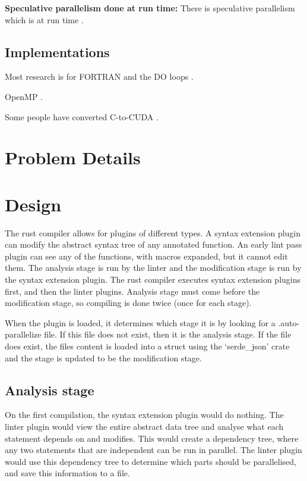 \documentclass[conference]{IEEEtran}
\begin{document}
\textbf{Speculative parallelism done at run time:}
There is speculative parallelism which is at run time \parencite{Yiapanis2015}.

\subsection{Implementations}
Most research is for FORTRAN and the DO loops \parencite{Banerjee1993}.

OpenMP \parencite{Dagum1998,Lam2011}.

Some people have converted C-to-CUDA \parencite{Baskaran2010, Verdoolaege2013}.

\section{Problem Details}


\section{Design}
The rust compiler allows for plugins of different types. A syntax extension plugin can modify the abstract syntax tree of any annotated function. An early lint pass plugin can see any of the functions, with macros expanded, but it cannot edit them.  The analysis stage is run by the linter and the modification stage is run by the syntax extension plugin. The rust compiler executes syntax extension plugins first, and then the linter plugins. Analysis stage must come before the modification stage, so compiling is done twice (once for each stage).

When the plugin is loaded, it determines which stage it is by looking for a .auto-parallelize file. If this file does not exist, then it is the analysis stage. If the file does exist, the files content is loaded into a struct using the `serde\_json' crate and the stage is updated to be the modification stage.

\subsection{Analysis stage}
On the first compilation, the syntax extension plugin would do nothing. The linter plugin would view the entire abstract data tree and analyse what each statement depends on and modifies. This would create a dependency tree, where any two statements that are independent can be run in parallel. The linter plugin would use this dependency tree to determine which parts should be parallelised, and save this information to a file.
\end{document}
